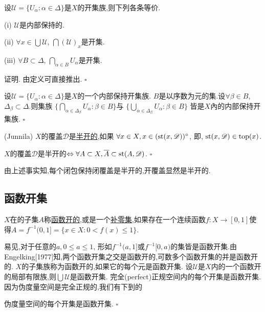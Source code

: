 \documentclass[main.tex]{subfiles}
\begin{document}
\begin{fact}
设$\mathscr{U}=\{U_\alpha:\alpha\in\Delta\}$是$X$的开集族,则下列各条等价.

\textnormal{(i)} $\mathscr{U}$是内部保持的.

\textnormal{(ii)} $\forall x\in\bigcup\mathscr{U}$, $\bigcap(\mathscr{U})_x$是开集.

\textnormal{(iii)} $\forall B\subset\Delta$, $\bigcap_{\alpha\in B}U_\alpha$是开集.
\end{fact}
证明. 由定义可直接推出. $\square$

\begin{fact}
设$\mathscr{U}=\{U_\alpha:\alpha\in\Delta\}$是$X$的一个内部保持开集族.
$B$是以序数为元的集.设$\forall \beta\in B$, $\Delta_\beta\subset \Delta$.则集族
$\{\bigcap_{\alpha\in\Delta_\beta}U_\alpha: \beta\in B\}$与
$\{\bigcup_{\alpha\in\Delta_\beta}U_\alpha: \beta\in B\}$
皆是$X$內的内部保持开集族. $\square$
\end{fact}

\begin{definition}
\textnormal{(Junnila)} $X$的覆盖$\mathscr{D}$是\underline{半开的},如果
$\forall x\in X, x\in(\textnormal{st}(x, \mathscr{D}))^\circ$, 即, 
$\textnormal{st}(x, \mathscr{D})\in\textnormal{top}(x)$.
\end{definition}

\begin{fact}
$X$的覆盖$\mathscr{D}$是半开的$\Leftrightarrow \forall A\subset X, \overline{A} \subset\textnormal{st}(A, \mathscr{D})$. $\square$
\end{fact}

由上述事实知,每个闭包保持闭覆盖是半开的,开覆盖显然是半开的.


\subsection{函数开集}\label{ch1.1.4}
\begin{definition}
	$X$在的子集$A$称\underline{函数开的},或是一个\underline{补零集},如果存在一个连续函数$f:X\rightarrow [0,1]$使得$A=f^{-1}(0,1]=\{x\in X: 0<f(x)\le 1\}$.
\end{definition}

易见,对于任意的$a, 0\le a\le1$, 形如$f^{-1}(a,1]$或$f^{-1}[0,a)$的集皆是函数开集.由 Engelking[1977]知,两个函数开集之交是函数开的,可数多个函数开集的并是函数开的.
$X$的子集族称为函数开的,如果它的每个元是函数开集.
设$\mathscr{U}$是$X$内的一个函数开的局部有限族,则$\bigcup \mathscr{U}$是函数开集.
完全(perfect)正规空间内的每个开集是函数开集.因为伪度量空间是完全正规的,我们有下到的

\begin{fact}
伪度量空间的每个开集是函数开集. $\square$
\end{fact}
\end{document}
